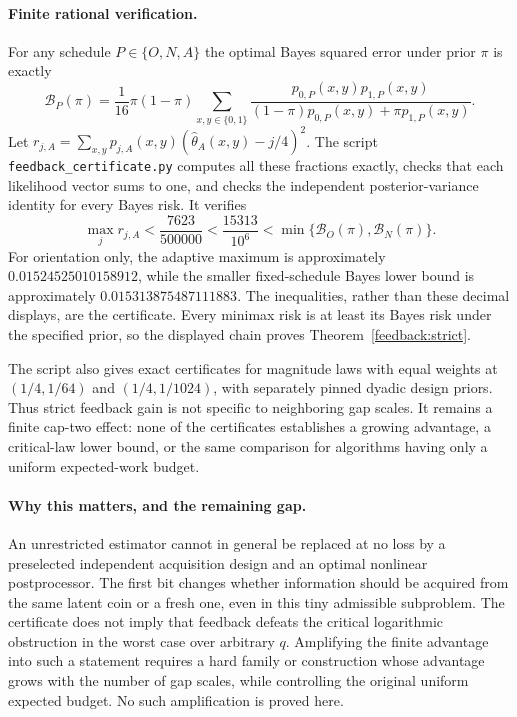 \paragraph{Finite rational verification.}
For any schedule $P\in\{O,N,A\}$ the optimal Bayes squared error under
prior $\pi$ is exactly
\[
 \mathcal B_P(\pi)=\frac1{16}\pi(1-\pi)
 \sum_{x,y\in\{0,1\}}
 \frac{p_{0,P}(x,y)p_{1,P}(x,y)}
 {(1-\pi)p_{0,P}(x,y)+\pi p_{1,P}(x,y)}.
\]
Let $r_{j,A}=\sum_{x,y}p_{j,A}(x,y)
(\widehat\theta_A(x,y)-j/4)^2$.
The script \texttt{feedback\_certificate.py} computes all these fractions
exactly, checks that each likelihood vector sums to one, and checks the
independent posterior-variance identity for every Bayes risk. It verifies
\[
 \max_j r_{j,A}<\frac{7623}{500000}
 <\frac{15313}{10^6}<\min\{\mathcal B_O(\pi),\mathcal B_N(\pi)\}.
\]
For orientation only, the adaptive maximum is approximately
$0.01524525010158912$, while the smaller fixed-schedule Bayes lower bound
is approximately $0.015313875487111883$.
The inequalities, rather than these decimal displays, are the certificate.
Every minimax risk is at least its Bayes risk under the specified prior,
so the displayed chain proves Theorem~\ref{feedback:strict}.

The script also gives exact certificates for magnitude laws with equal
weights at $(1/4,1/64)$ and $(1/4,1/1024)$, with separately pinned dyadic
design priors. Thus strict feedback gain is not specific to neighboring
gap scales. It remains a finite cap-two effect: none of the certificates
establishes a growing advantage, a critical-law lower bound, or the same
comparison for algorithms having only a uniform expected-work budget.

\paragraph{Why this matters, and the remaining gap.}
An unrestricted estimator cannot in general be replaced at no loss by a
preselected independent acquisition design and an optimal nonlinear
postprocessor. The first bit changes whether information should be acquired
from the same latent coin or a fresh one, even in this tiny admissible
subproblem. The certificate does not imply that feedback defeats the
critical logarithmic obstruction in the worst case over arbitrary $q$.
Amplifying the finite advantage into such a statement requires a hard
family or construction whose advantage grows with the number of gap scales,
while controlling the original uniform expected budget. No such
amplification is proved here.
